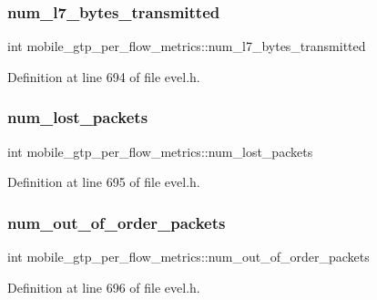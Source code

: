 \subsubsection{\texorpdfstring{num\+\_\+l7\+\_\+bytes\+\_\+transmitted}{num\_l7\_bytes\_transmitted}}
{\footnotesize\ttfamily int mobile\+\_\+gtp\+\_\+per\+\_\+flow\+\_\+metrics\+::num\+\_\+l7\+\_\+bytes\+\_\+transmitted}



Definition at line 694 of file evel.\+h.

\hypertarget{structmobile__gtp__per__flow__metrics_a6c80c85063b326f5a93f317bab5c2f50}{}\label{structmobile__gtp__per__flow__metrics_a6c80c85063b326f5a93f317bab5c2f50} 
\subsubsection{\texorpdfstring{num\+\_\+lost\+\_\+packets}{num\_lost\_packets}}
{\footnotesize\ttfamily int mobile\+\_\+gtp\+\_\+per\+\_\+flow\+\_\+metrics\+::num\+\_\+lost\+\_\+packets}



Definition at line 695 of file evel.\+h.

\hypertarget{structmobile__gtp__per__flow__metrics_aa05dc7172d20af02cc149ba0e7c107c1}{}\label{structmobile__gtp__per__flow__metrics_aa05dc7172d20af02cc149ba0e7c107c1} 
\subsubsection{\texorpdfstring{num\+\_\+out\+\_\+of\+\_\+order\+\_\+packets}{num\_out\_of\_order\_packets}}
{\footnotesize\ttfamily int mobile\+\_\+gtp\+\_\+per\+\_\+flow\+\_\+metrics\+::num\+\_\+out\+\_\+of\+\_\+order\+\_\+packets}



Definition at line 696 of file evel.\+h.

